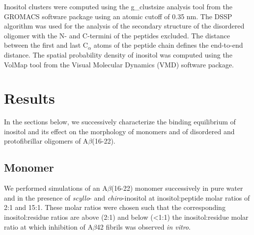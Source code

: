 Inositol clusters were computed using the g\_clustsize analysis tool from the GROMACS software package using an atomic cutoff of 0.35 nm. The DSSP algorithm was used for the analysis of the secondary structure of the disordered oligomer with the N- and C-termini of the peptides excluded. The distance between the first and last C$_{\alpha}$ atoms of the peptide chain defines the end-to-end distance. The spatial probability density of inositol was computed using the VolMap tool from the Visual Molecular Dynamics (VMD) software package.\cite{Humphrey:1996p850}

\section{Results}

In the sections below, we successively characterize the binding equilibrium of inositol and its effect on the morphology of monomers and of disordered and protofibrillar oligomers of A$\beta$(16-22).

\subsection{Monomer}

We performed simulations of an A$\beta$(16-22) monomer successively in pure water and in the presence of \emph{scyllo}- and \emph{chiro}-inositol at inositol:peptide molar ratios of 2:1 and 15:1.  These molar ratios were chosen such that the corresponding inositol:residue ratios are above (2:1) and below (<1:1) the inositol:residue molar ratio at which inhibition of A$\beta$42 fibrils was observed \emph{in vitro}.\cite{McLaurin:2000p64}

